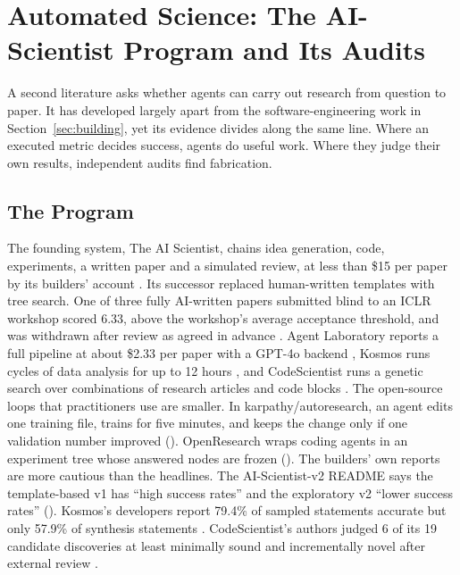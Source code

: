 \section{Automated Science: The AI-Scientist Program and Its Audits}\label{sec:science}

A second literature asks whether agents can carry out research from question to paper. It has developed largely apart from the software-engineering work in Section~\ref{sec:building}, yet its evidence divides along the same line. Where an executed metric decides success, agents do useful work. Where they judge their own results, independent audits find fabrication.

\subsection{The Program}\label{sec:science-program}

The founding system, The AI Scientist, chains idea generation, code, experiments, a written paper and a simulated review, at less than \$15 per paper by its builders' account \citep{S1}. Its successor replaced human-written templates with tree search. One of three fully AI-written papers submitted blind to an ICLR workshop scored 6.33, above the workshop's average acceptance threshold, and was withdrawn after review as agreed in advance \citep{S2,S33}. Agent Laboratory reports a full pipeline at about \$2.33 per paper with a GPT-4o backend \citep{S3}, Kosmos runs cycles of data analysis for up to 12 hours \citep{S13}, and CodeScientist runs a genetic search over combinations of research articles and code blocks \citep{S34}. The open-source loops that practitioners use are smaller. In karpathy/autoresearch, an agent edits one training file, trains for five minutes, and keeps the change only if one validation number improved (). OpenResearch wraps coding agents in an experiment tree whose answered nodes are frozen (). The builders' own reports are more cautious than the headlines. The AI-Scientist-v2 README says the template-based v1 has ``high success rates'' and the exploratory v2 ``lower success rates'' (). Kosmos's developers report 79.4\% of sampled statements accurate but only 57.9\% of synthesis statements \citep{S13}. CodeScientist's authors judged 6 of its 19 candidate discoveries at least minimally sound and incrementally novel after external review \citep{S34}.

